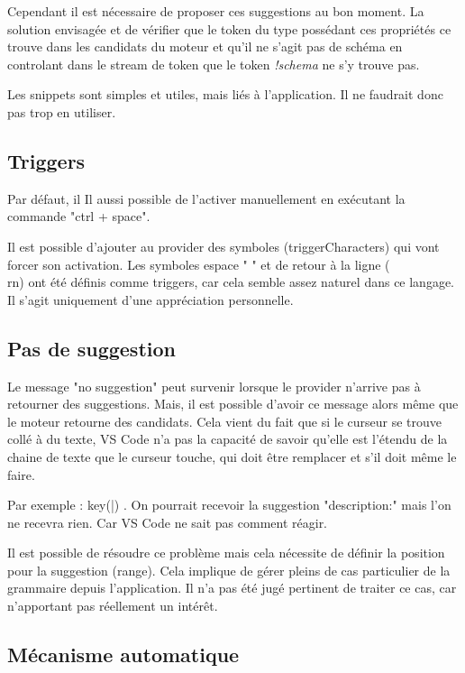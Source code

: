 \documentclass[
    iict, %
    il, %
]{heig-tb}
\begin{document}
Cependant il est nécessaire de proposer ces suggestions au bon moment. La solution envisagée et de vérifier que le token du type possédant
ces propriétés ce trouve dans les candidats du moteur et qu'il ne s'agit pas de schéma en controlant dans le stream de token que le token \emph{!schema} ne s'y trouve pas.

Les snippets sont simples et utiles, mais liés à l'application. Il ne faudrait donc pas trop en utiliser.

\subsection{Triggers}
Par défaut, il Il aussi possible de l'activer manuellement en exécutant la commande "ctrl + space".

Il est possible d'ajouter au provider des symboles (triggerCharacters) qui vont forcer son activation. Les symboles espace " " et de retour à la ligne (\\rn) ont été définis comme triggers, car cela semble assez naturel dans ce langage.
Il s'agit uniquement d'une appréciation personnelle.

\subsection{Pas de suggestion}

Le message "no suggestion" peut survenir lorsque le provider n'arrive pas à retourner des suggestions.
Mais, il est possible d'avoir ce message alors même que le moteur retourne des candidats. Cela vient du fait
que si le curseur se trouve collé à du texte, VS Code n'a pas la capacité de savoir qu'elle est l'étendu de la chaine de texte que le curseur touche,
qui doit être remplacer et s'il doit même le faire.

Par exemple : { key(|) }.
On pourrait recevoir la suggestion "description:" mais l'on ne recevra rien. Car VS Code ne sait pas comment réagir.

Il est possible de résoudre ce problème mais cela nécessite de définir la position pour la suggestion (range).
Cela implique de gérer pleins de cas particulier de la grammaire depuis l'application. Il n'a pas été jugé pertinent de traiter ce cas, car n'apportant pas réellement un intérêt.

\subsection{Mécanisme automatique}
\end{document}
